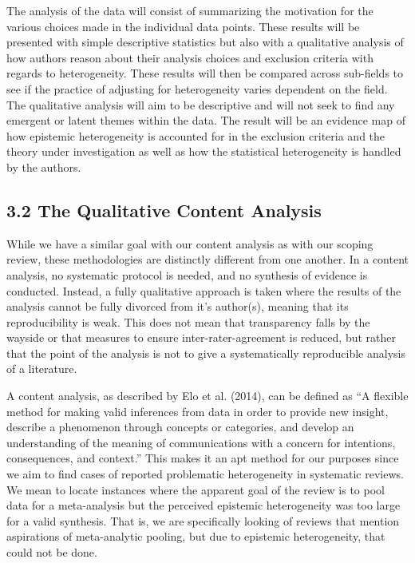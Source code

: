 \documentclass[
  letterpaper,
  DIV=11,
  numbers=noendperiod]{scrartcl}
\begin{document}
The analysis of the data will consist of summarizing the motivation for
the various choices made in the individual data points. These results
will be presented with simple descriptive statistics but also with a
qualitative analysis of how authors reason about their analysis choices
and exclusion criteria with regards to heterogeneity. These results will
then be compared across sub-fields to see if the practice of adjusting
for heterogeneity varies dependent on the field. The qualitative
analysis will aim to be descriptive and will not seek to find any
emergent or latent themes within the data. The result will be an
evidence map of how epistemic heterogeneity is accounted for in the
exclusion criteria and the theory under investigation as well as how the
statistical heterogeneity is handled by the authors.

\hypertarget{the-qualitative-content-analysis}{%
\subsection{3.2 The Qualitative Content
Analysis}\label{the-qualitative-content-analysis}}

While we have a similar goal with our content analysis as with our
scoping review, these methodologies are distinctly different from one
another. In a content analysis, no systematic protocol is needed, and no
synthesis of evidence is conducted. Instead, a fully qualitative
approach is taken where the results of the analysis cannot be fully
divorced from it's author(s), meaning that its reproducibility is weak.
This does not mean that transparency falls by the wayside or that
measures to ensure inter-rater-agreement is reduced, but rather that the
point of the analysis is not to give a systematically reproducible
analysis of a literature.

A content analysis, as described by Elo et al. (2014), can be defined as
``A flexible method for making valid inferences from data in order to
provide new insight, describe a phenomenon through concepts or
categories, and develop an understanding of the meaning of
communications with a concern for intentions, consequences, and
context.'' This makes it an apt method for our purposes since we aim to
find cases of reported problematic heterogeneity in systematic reviews.
We mean to locate instances where the apparent goal of the review is to
pool data for a meta-analysis but the perceived epistemic heterogeneity
was too large for a valid synthesis. That is, we are specifically
looking of reviews that mention aspirations of meta-analytic pooling,
but due to epistemic heterogeneity, that could not be done.
\end{document}
